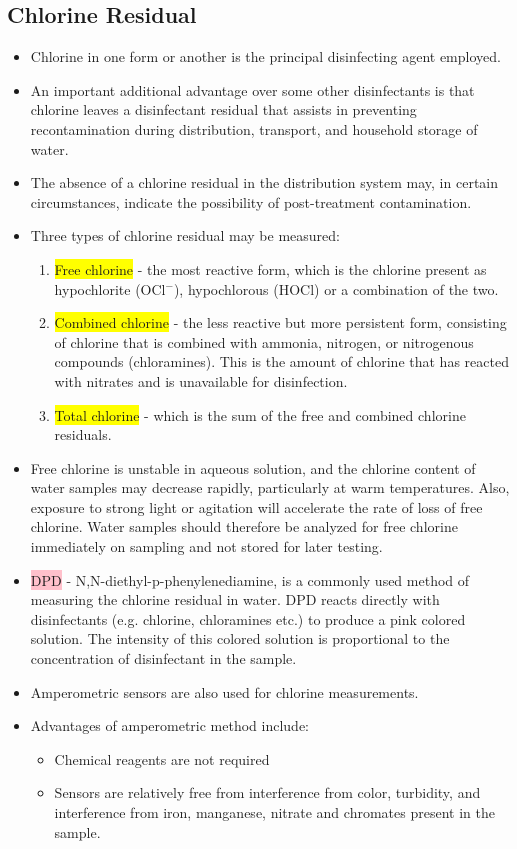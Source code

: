 \subsection{Chlorine Residual}
\begin{itemize}
\item  Chlorine in one form or another is the principal disinfecting agent employed. 
\item An important additional advantage over some other disinfectants is that chlorine leaves a disinfectant residual that assists in preventing recontamination during distribution, transport, and household storage of water. 
\item The absence of a chlorine residual in the distribution system may, in certain circumstances, indicate the possibility of post-treatment contamination.
\item Three types of chlorine residual may be measured: 
\begin{enumerate}
\item \colorbox{yellow}{Free chlorine} - the most reactive form, which is the chlorine present as hypochlorite (OCl$^-$), hypochlorous (HOCl) or a combination of the two.  
\item \colorbox{yellow}{Combined chlorine} - the less reactive but more persistent form, consisting of chlorine that is combined with ammonia, nitrogen, or nitrogenous compounds (chloramines). This is the amount of chlorine that has reacted with nitrates and is unavailable for disinfection. 
\item \colorbox{yellow}{Total chlorine} - which is the sum of the free and combined chlorine residuals.
\end{enumerate}
\item Free chlorine is unstable in aqueous solution, and the chlorine content of water samples may decrease rapidly, particularly at warm temperatures. Also, exposure to strong light or agitation will accelerate the rate of loss of free chlorine. Water samples should therefore be analyzed for free chlorine immediately on sampling and not stored for later testing.
\item \colorbox{pink}{DPD} - N,N-diethyl-p-phenylenediamine, is a commonly used method of measuring the chlorine residual in water. DPD reacts directly with disinfectants (e.g. chlorine, chloramines etc.) to produce a pink colored solution. The intensity of this colored solution is proportional to the concentration of disinfectant in the sample.
\item Amperometric sensors are also used for chlorine measurements.  
\item Advantages of amperometric method include:
\begin{itemize}
\item Chemical reagents are not required
\item Sensors are relatively free from interference from color, turbidity, and interference from iron, manganese, nitrate and chromates present in the sample.
\end{itemize}
\end{itemize}

